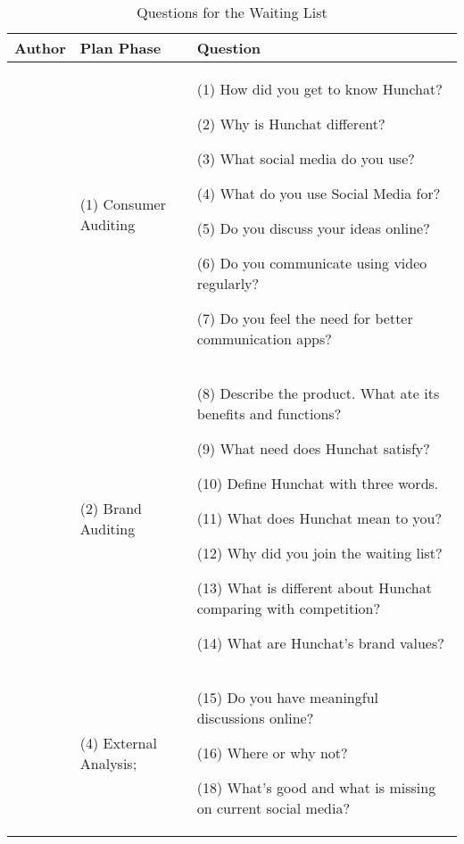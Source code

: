 \documentclass[12pt]{article}
\begin{document}
\begin{table}[htb]
\small
\caption{Questions for the Waiting List}
\label{table:focus}
\centering
\begin{tabular}{ @{}P{0.15\textwidth}P{0.2\textwidth}P{0.6\textwidth}@{} }
Author                             & Plan Phase             & Question                                                                                                                                                                                                                                                                                                                                                      \\ \hline
{} & (1) Consumer Auditing  & (1) How did you get to know Hunchat? \par (2) Why is Hunchat different?\par (3) What social media do you use?\par (4) What do you use Social Media for? \par (5) Do you discuss your ideas online? \par (6) Do you communicate using video regularly? \par (7) Do you feel the need for better communication apps?                                                                                                                  \\
                                   & (2) Brand Auditing     & (8) Describe the product. What ate its benefits and functions?\par (9) What need does Hunchat satisfy?\par (10) Define Hunchat with three words.\par  (11) What does Hunchat mean to you?\par (12) Why did you join the waiting list?\par (13) What is different about Hunchat comparing with competition?\par (14) What are Hunchat's brand values? \\ \hline
\cite{clow}    & (4) External Analysis; & (15) Do you have meaningful discussions online? \par (16) Where or why not? \par (18) What's good and what is missing on current social media?                                                                                                                                                                                                                                                                                                               \\

\end{tabular}
\end{table}
\end{document}
